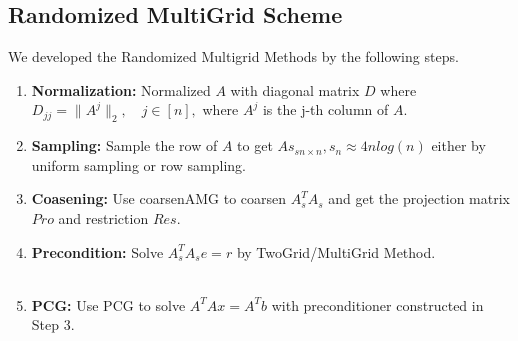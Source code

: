 \subsection{Randomized MultiGrid Scheme}
We developed the Randomized Multigrid Methods by the following steps.
\begin{tcolorbox}
\begin{enumerate}
\item \textbf{Normalization:} Normalized $A$ with diagonal matrix $D$ where $D_{jj} = \|A^j\|_2, \quad j \in [n], $ \quad where
$A^j$ is the j-th column of $A$. \\
\item \textbf{Sampling:} Sample the row of $A$ to get $As_{sn \times n}, s_n \approx 4 n log(n)$ either by uniform sampling or row sampling. \\
\item \textbf{Coasening:} Use coarsenAMG to coarsen $A_s^T A_s$ and get the projection matrix  $Pro$ and restriction $Res$. \\
\item \textbf{Precondition:} Solve $A_s^T A_s e =r$ by TwoGrid/MultiGrid Method. \\
 \\
\item \textbf{PCG:} Use PCG to solve $A^TA x = A^Tb$ with preconditioner constructed in Step 3.
\end{enumerate}
\end{tcolorbox}

